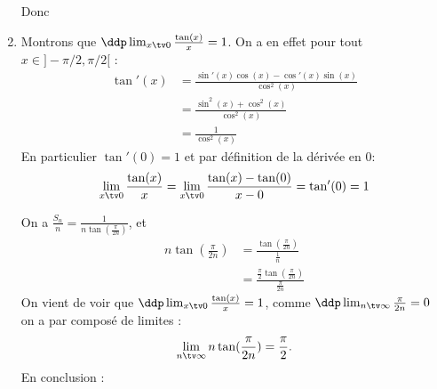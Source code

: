 \begin{correction}
\begin{enumerate}
Donc 
\begin{center}
\end{center}

\item Montrons que $\ddp\lim_{x\tv 0} \frac{\tan(x)}{x}=1$. 
On a en effet pour tout $x\in ]-\pi/2, \pi/2[$  :
\begin{align*}
\tan'(x) &=\frac{\sin'(x)\cos(x)-\cos'(x)\sin(x)}{\cos^2(x)}\\
			&=\frac{\sin^2(x)+\cos^2(x)}{\cos^2(x)}\\
			&=\frac{1}{\cos^2(x)}			
\end{align*}
En particulier $\tan'(0)=1$ et par définition  de la dérivée en $0$: 
$$\lim_{x\tv 0} \frac{\tan(x)}{x}=\lim_{x\tv 0} \frac{\tan(x)-\tan(0)}{x-0}=\tan'(0)=1$$

On a  $\frac{S_n}{n}= \frac{1}{n \tan(\frac{\pi}{2n})}$, et 
\begin{align*}
n \tan(\frac{\pi}{2n}) &= \frac{ \tan(\frac{\pi}{2n}) }{\frac{1}{n}}\\
								&= \frac{ \frac{\pi}{2}\tan(\frac{\pi}{2n}) }{\frac{\pi}{2n}}
\end{align*}
On vient de voir que $\ddp\lim_{x\tv 0} \frac{\tan(x)}{x}=1$, comme $\ddp \lim_{n\tv \infty} \frac{\pi}{2n}=0$ on a par composé de limites : 
$$\lim_{n\tv \infty} n \tan(\frac{\pi}{2n})  =\frac{\pi}{2}.$$
En conclusion : 
\begin{center}
\end{center}
\end{enumerate}
\end{correction}